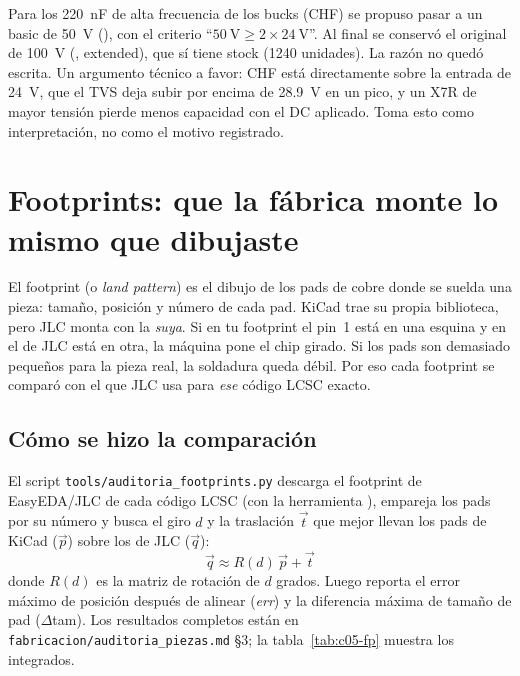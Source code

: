 \begin{ojo}
Para los \SI{220}{\nano\farad} de alta frecuencia de los bucks (CHF) se propuso pasar a un basic de \SI{50}{\volt} (), con el criterio ``$\SI{50}{\volt}\ge 2\times\SI{24}{\volt}$''. Al final se conservó el original de \SI{100}{\volt} (, extended), que sí tiene stock (\num{1240} unidades). La razón no quedó escrita. Un argumento técnico a favor: CHF está directamente sobre la entrada de \SI{24}{\volt}, que el TVS deja subir por encima de \SI{28.9}{\volt} en un pico, y un X7R de mayor tensión pierde menos capacidad con el DC aplicado. Toma esto como interpretación, no como el motivo registrado.
\end{ojo}

\section{Footprints: que la fábrica monte lo mismo que dibujaste}\label{sec:c05-footprints}

\begin{idea}
El footprint (o \emph{land pattern}) es el dibujo de los pads de cobre donde se suelda una pieza: tamaño, posición y número de cada pad. KiCad trae su propia biblioteca, pero JLC monta con la \emph{suya}. Si en tu footprint el pin~1 está en una esquina y en el de JLC está en otra, la máquina pone el chip girado. Si los pads son demasiado pequeños para la pieza real, la soldadura queda débil. Por eso cada footprint se comparó con el que JLC usa para \emph{ese} código LCSC exacto.
\end{idea}

\subsection{Cómo se hizo la comparación}

El script \nolinkurl{tools/auditoria_footprints.py} descarga el footprint de EasyEDA/JLC de cada código LCSC (con la herramienta ), empareja los pads por su número y busca el giro $d$ y la traslación $\vec t$ que mejor llevan los pads de KiCad ($\vec p$) sobre los de JLC ($\vec q$):
\[
\vec q \approx R(d)\,\vec p + \vec t
\]
donde $R(d)$ es la matriz de rotación de $d$ grados. Luego reporta el error máximo de posición después de alinear (\emph{err}) y la diferencia máxima de tamaño de pad ($\Delta$tam). Los resultados completos están en \nolinkurl{fabricacion/auditoria_piezas.md} §3; la tabla~\ref{tab:c05-fp} muestra los integrados.

